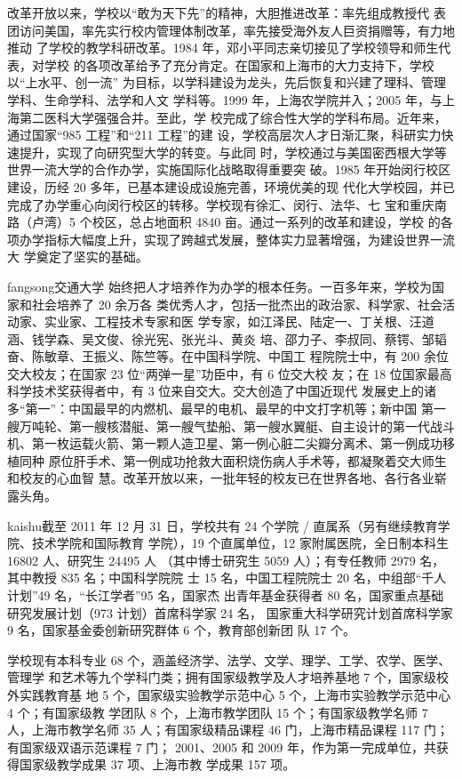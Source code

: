 {\heiti 改革开放以来，学校以“敢为天下先”的精神，大胆推进改革：率先组成教授代
  表团访问美国，率先实行校内管理体制改革，率先接受海外友人巨资捐赠等，有力地推动
  了学校的教学科研改革。1984 年，邓小平同志亲切接见了学校领导和师生代表，对学校
  的各项改革给予了充分肯定。在国家和上海市的大力支持下，学校以“上水平、创一流”
  为目标，以学科建设为龙头，先后恢复和兴建了理科、管理学科、生命学科、法学和人文
  学科等。1999 年，上海农学院并入；2005 年，与上海第二医科大学强强合并。至此，学
  校完成了综合性大学的学科布局。近年来，通过国家“985 工程”和“211 工程”的建
  设，学校高层次人才日渐汇聚，科研实力快速提升，实现了向研究型大学的转变。与此同
  时，学校通过与美国密西根大学等世界一流大学的合作办学，实施国际化战略取得重要突
  破。1985 年开始闵行校区建设，历经 20 多年，已基本建设成设施完善，环境优美的现
  代化大学校园，并已完成了办学重心向闵行校区的转移。学校现有徐汇、闵行、法华、七
  宝和重庆南路（卢湾）5 个校区，总占地面积 4840 亩。通过一系列的改革和建设，学校
  的各项办学指标大幅度上升，实现了跨越式发展，整体实力显著增强，为建设世界一流大
  学奠定了坚实的基础。}

{\ifcsname fangsong\endcsname\fangsong\else[无 \cs{fangsong} 字体。]\fi 交通大学
  始终把人才培养作为办学的根本任务。一百多年来，学校为国家和社会培养了 20 余万各
  类优秀人才，包括一批杰出的政治家、科学家、社会活动家、实业家、工程技术专家和医
  学专家，如江泽民、陆定一、丁关根、汪道涵、钱学森、吴文俊、徐光宪、张光斗、黄炎
  培、邵力子、李叔同、蔡锷、邹韬奋、陈敏章、王振义、陈竺等。在中国科学院、中国工
  程院院士中，有 200 余位交大校友；在国家 23 位“两弹一星”功臣中，有 6 位交大校
  友；在 18 位国家最高科学技术奖获得者中，有 3 位来自交大。交大创造了中国近现代
  发展史上的诸多“第一”：中国最早的内燃机、最早的电机、最早的中文打字机等；新中国
  第一艘万吨轮、第一艘核潜艇、第一艘气垫船、第一艘水翼艇、自主设计的第一代战斗
  机、第一枚运载火箭、第一颗人造卫星、第一例心脏二尖瓣分离术、第一例成功移植同种
  原位肝手术、第一例成功抢救大面积烧伤病人手术等，都凝聚着交大师生和校友的心血智
  慧。改革开放以来，一批年轻的校友已在世界各地、各行各业崭露头角。}

{\ifcsname kaishu\endcsname\kaishu\else[无 \cs{kaishu} 字体。]\fi 截至 2011 年
  12 月 31 日，学校共有 24 个学院 / 直属系（另有继续教育学院、技术学院和国际教育
  学院），19 个直属单位，12 家附属医院，全日制本科生 16802 人、研究生 24495 人
  （其中博士研究生 5059 人）；有专任教师 2979 名，其中教授 835 名；中国科学院院
  士 15 名，中国工程院院士 20 名，中组部“千人计划”49 名，“长江学者”95 名，国家杰
  出青年基金获得者 80 名，国家重点基础研究发展计划（973 计划）首席科学家 24 名，
  国家重大科学研究计划首席科学家 9 名，国家基金委创新研究群体 6 个，教育部创新团
  队 17 个。
  
  学校现有本科专业 68 个，涵盖经济学、法学、文学、理学、工学、农学、医学、管理学
  和艺术等九个学科门类；拥有国家级教学及人才培养基地 7 个，国家级校外实践教育基
  地 5 个，国家级实验教学示范中心 5 个，上海市实验教学示范中心 4 个；有国家级教
  学团队 8 个，上海市教学团队 15 个；有国家级教学名师 7 人，上海市教学名师 35
  人；有国家级精品课程 46 门，上海市精品课程 117 门；有国家级双语示范课程 7 门；
  2001、2005 和 2009 年，作为第一完成单位，共获得国家级教学成果 37 项、上海市教
  学成果 157 项。}
